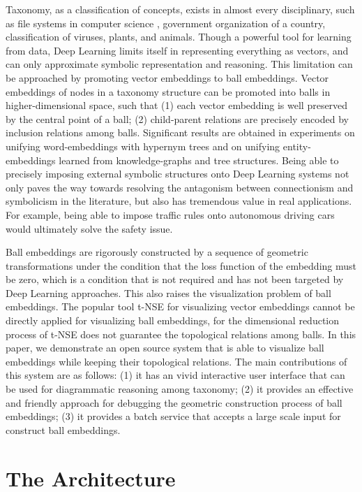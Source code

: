 \documentclass[runningheads]{llncs}
\begin{document}
Taxonomy, as a classification of concepts, exists in almost every disciplinary, such as file systems in computer science , government organization of a country, classification of viruses, plants, and animals. Though a powerful tool for learning from data, Deep Learning limits itself in representing everything as vectors, and can only approximate symbolic representation and reasoning. This limitation can be approached by promoting vector embeddings to ball embeddings. Vector embeddings of nodes in a taxonomy structure can be promoted into balls in higher-dimensional space, such that (1) each vector embedding is well preserved by the central point of a ball; (2) child-parent relations are precisely encoded by inclusion relations among balls. Significant results are obtained in experiments on unifying word-embeddings with hypernym trees and on unifying entity-embeddings learned from knowledge-graphs and tree structures. Being able to precisely imposing external symbolic structures onto Deep Learning systems not only paves the way towards resolving the antagonism between connectionism and symbolicism in the literature, but also has tremendous value in real applications. For example, being able to impose traffic rules onto autonomous driving cars would ultimately solve the safety issue.  

Ball embeddings are rigorously constructed by a sequence of geometric transformations under the  condition that the loss function of the embedding must be zero, which is a condition that is not required and has not been targeted by Deep Learning approaches. This also raises the visualization problem of ball embeddings. The popular  tool t-NSE for visualizing vector embeddings cannot be directly applied for visualizing ball embeddings, for the dimensional reduction process of t-NSE does not guarantee the topological relations among balls. In this paper, we demonstrate an open source system that is able to visualize ball embeddings while keeping their topological relations. The main contributions of this system are as follows: (1) it has an vivid interactive user interface that can be used for diagrammatic reasoning among taxonomy; (2) it provides an effective and friendly approach for debugging the geometric construction process of ball embeddings; (3) it provides a batch service that accepts a large scale input for construct ball embeddings. 

\section{The Architecture}
\end{document}
